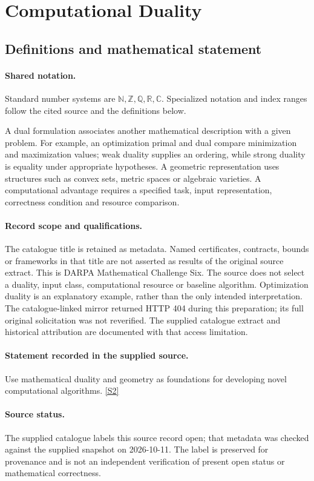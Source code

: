 \documentclass[11pt]{article}
\newcommand{\sref}[2]{\hyperlink{source:#1:#2}{[S#2]}}
\begin{document}
\section{Computational Duality}\label{statement}

\subsection{Definitions and mathematical statement}

\paragraph{Shared notation.}Standard number systems are $\mathbb N,\mathbb Z,\mathbb Q,\mathbb R,\mathbb C$. Specialized notation and index ranges follow the cited source and the definitions below.


A dual formulation associates another mathematical description with a given problem. For example, an optimization primal and dual compare minimization and maximization values; weak duality supplies an ordering, while strong duality is equality under appropriate hypotheses. A geometric representation uses structures such as convex sets, metric spaces or algebraic varieties. A computational advantage requires a specified task, input representation, correctness condition and resource comparison.
\paragraph{Record scope and qualifications.}
The catalogue title is retained as metadata. Named certificates, contracts, bounds or frameworks in that title are not asserted as results of the original source extract.
This is DARPA Mathematical Challenge Six. The source does not select a duality, input class, computational resource or baseline algorithm. Optimization duality is an explanatory example, rather than the only intended interpretation. The catalogue-linked mirror returned HTTP 404 during this preparation; its full original solicitation was not reverified. The supplied catalogue extract and historical attribution are documented with that access limitation.
\paragraph{Statement recorded in the supplied source.}
Use mathematical duality and geometry as foundations for developing novel computational algorithms. \sref{statement}{2}
\paragraph{Source status.}
The supplied catalogue labels this source record open; that metadata was checked against the supplied snapshot on 2026-10-11. The label is preserved for provenance and is not an independent verification of present open status or mathematical correctness.
\end{document}

